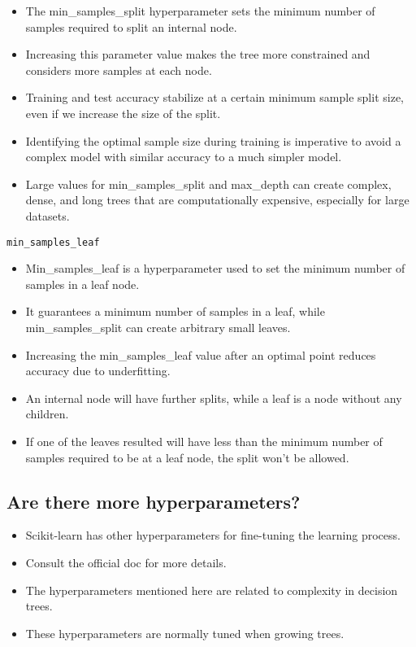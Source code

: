 \documentclass[11pt]{article}
\providecommand{\tightlist}{%
      \setlength{\itemsep}{0pt}\setlength{\parskip}{0pt}}
\begin{document}
\begin{itemize}
\tightlist
\item
  The min\_samples\_split hyperparameter sets the minimum number of
  samples required to split an internal node.
\item
  Increasing this parameter value makes the tree more constrained and
  considers more samples at each node.
\item
  Training and test accuracy stabilize at a certain minimum sample split
  size, even if we increase the size of the split.
\item
  Identifying the optimal sample size during training is imperative to
  avoid a complex model with similar accuracy to a much simpler model.
\item
  Large values for min\_samples\_split and max\_depth can create
  complex, dense, and long trees that are computationally expensive,
  especially for large datasets.
\end{itemize}

\texttt{min\_samples\_leaf}

\begin{itemize}
\tightlist
\item
  Min\_samples\_leaf is a hyperparameter used to set the minimum number
  of samples in a leaf node.
\item
  It guarantees a minimum number of samples in a leaf, while
  min\_samples\_split can create arbitrary small leaves.
\item
  Increasing the min\_samples\_leaf value after an optimal point reduces
  accuracy due to underfitting.
\item
  An internal node will have further splits, while a leaf is a node
  without any children.
\item
  If one of the leaves resulted will have less than the minimum number
  of samples required to be at a leaf node, the split won't be allowed.
\end{itemize}

\hypertarget{are-there-more-hyperparameters}{%
\subsection{Are there more
hyperparameters?}\label{are-there-more-hyperparameters}}

\begin{itemize}
\tightlist
\item
  Scikit-learn has other hyperparameters for fine-tuning the learning
  process.
\item
  Consult the official doc for more details.
\item
  The hyperparameters mentioned here are related to complexity in
  decision trees.
\item
  These hyperparameters are normally tuned when growing trees.
\end{itemize}
\end{document}
